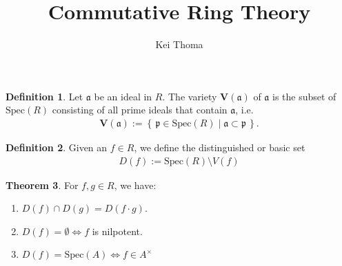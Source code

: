 \documentclass[a4paper]{book}
\title{Commutative Ring Theory}
\author{Kei Thoma}
\theoremstyle{definition}
\newtheorem{definition}{Definition}[]
\newtheorem{theorem}[definition]{Theorem}
\newcommand{\makeset}[2]{\left\{\, #1 \mid #2 \,\right\}}
\begin{document}
\begin{defbox}
    \begin{definition}
        Let \(\mathfrak{a}\) be an ideal in \(R\). The variety \(\boldsymbol{V}(\mathfrak{a})\) of \(\mathfrak{a}\) is the subset of \(\text{Spec}(R)\) consisting of all prime ideals that contain \(\mathfrak{a}\), i.e.
        \begin{align*}
            \boldsymbol{V}(\mathfrak{a}) := \makeset{\mathfrak{p} \in \text{Spec}(R)}{\mathfrak{a} \subset \mathfrak{p}} \text{.}
        \end{align*}
    \end{definition}
\end{defbox}


\begin{defbox}
    \begin{definition}
        Given an \(f \in R\), we define the distinguished or basic set
        \begin{align*}
            D(f) := \text{Spec}(R) \setminus V(f)
        \end{align*}
    \end{definition}
\end{defbox}

\begin{thmbox}
    \begin{theorem}
        For \(f, g \in R\), we have:
        \begin{enumerate}
            \item \(D(f) \cap D(g) = D(f \cdot g)\).
            \item \(D(f) = \emptyset \iff f\) is nilpotent.
            \item \(D(f) = \text{Spec}(A) \iff f \in A^\times\)
        \end{enumerate}
    \end{theorem}
\end{thmbox}
\end{document}
